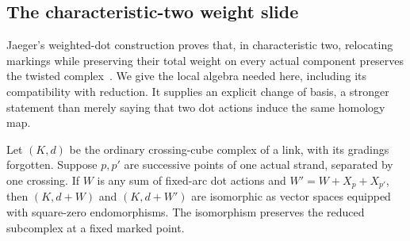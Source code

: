 \subsection{The characteristic-two weight slide}

Jaeger's weighted-dot construction proves that, in characteristic two,
relocating markings while preserving their total weight on every actual
component preserves the twisted complex~\cite[Theorem~3.1]{jaeger}. We give
the local algebra needed here, including its compatibility with reduction.
It supplies an explicit change of basis, a stronger statement than merely
saying that two dot actions induce the same homology map.

\begin{lemma}\label{slope-slide}
Let $(K,d)$ be the ordinary crossing-cube complex of a link, with its
gradings forgotten. Suppose $p,p'$ are successive points of one actual
strand, separated by one crossing. If $W$ is any sum of fixed-arc dot
actions and $W'=W+X_p+X_{p'}$, then $(K,d+W)$ and $(K,d+W')$ are isomorphic
as vector spaces equipped with square-zero endomorphisms. The isomorphism
preserves the reduced subcomplex at a fixed marked point.
\end{lemma}

